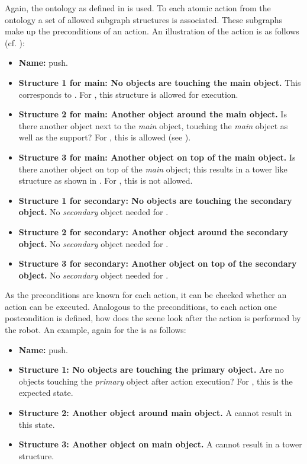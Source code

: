 Again, the ontology as defined in  is used.
To each atomic action from the ontology a set of allowed subgraph structures is associated.
These subgraphs make up the preconditions of an action.
An illustration of the action  is as follows (cf. ):

\begin{itemize}
  \item \textbf{Name:} push.
  \item \textbf{Structure 1 for main: No objects are touching the main object.} This corresponds to . For , this structure is allowed for execution.
  \item \textbf{Structure 2 for main: Another object around the main object.} Is there another object next to the \emph{main} object, touching the \emph{main} object as well as the support? For , this is allowed (see ).
  \item \textbf{Structure 3 for main: Another object on top of the main object.} Is there another object on top of the \emph{main} object; this results in a tower like structure as shown in . For , this is not allowed.
  \item \textbf{Structure 1 for secondary: No objects are touching the secondary object.} No \emph{secondary} object needed for .
  \item \textbf{Structure 2 for secondary: Another object around the secondary object.} No \emph{secondary} object needed for .
  \item \textbf{Structure 3 for secondary: Another object on top of the secondary object.} No \emph{secondary} object needed for .
\end{itemize}

As the preconditions are known for each action, it can be checked wheth\-er an action can be executed.
Analogous to the preconditions, to each action one postcondition is defined, \ie how does the scene look after the action is performed by the robot.
An example, again for the  is as follows:

\begin{itemize}
  \item \textbf{Name:} push.
  \item \textbf{Structure 1: No objects are touching the primary object.} Are no objects touching the \emph{primary} object after action execution? For , this is the expected state.
  \item \textbf{Structure 2: Another object around main object. } A  cannot result in this state.
  \item \textbf{Structure 3: Another object on main object.} A  cannot result in a tower structure.
\end{itemize}

